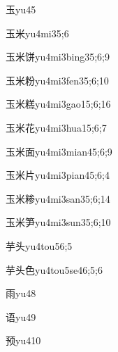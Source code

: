 \begin{verbete}{玉}{yu4}{5}
\end{verbete}
\begin{verbete}{玉米}{yu4mi3}{5;6}
\end{verbete}
\begin{verbete}{玉米饼}{yu4mi3bing3}{5;6;9}
\end{verbete}
\begin{verbete}{玉米粉}{yu4mi3fen3}{5;6;10}
\end{verbete}
\begin{verbete}{玉米糕}{yu4mi3gao1}{5;6;16}
\end{verbete}
\begin{verbete}{玉米花}{yu4mi3hua1}{5;6;7}
\end{verbete}
\begin{verbete}{玉米面}{yu4mi3mian4}{5;6;9}
\end{verbete}
\begin{verbete}{玉米片}{yu4mi3pian4}{5;6;4}
\end{verbete}
\begin{verbete}{玉米糁}{yu4mi3san3}{5;6;14}
\end{verbete}
\begin{verbete}{玉米笋}{yu4mi3sun3}{5;6;10}
\end{verbete}
\begin{verbete}{芋头}{yu4tou5}{6;5}
\end{verbete}
\begin{verbete}{芋头色}{yu4tou5se4}{6;5;6}
\end{verbete}
\begin{verbete}{雨}{yu4}{8}
\end{verbete}
\begin{verbete}{语}{yu4}{9}
\end{verbete}
\begin{verbete}{预}{yu4}{10}
\end{verbete}
